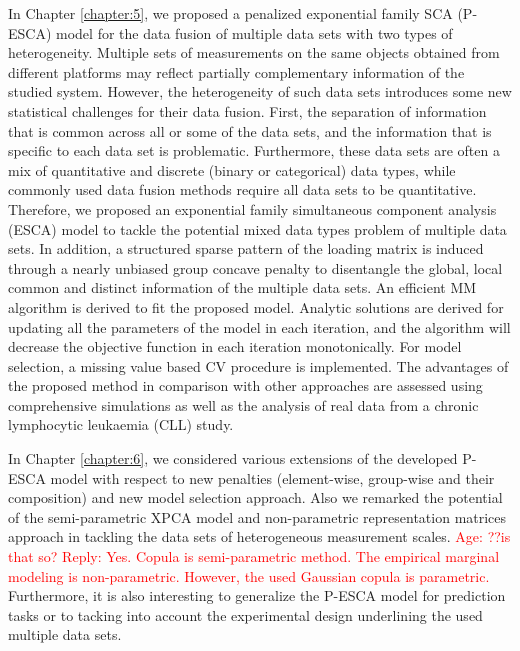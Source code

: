 In Chapter \ref{chapter:5}, we proposed a penalized exponential family SCA (P-ESCA) model for the data fusion of multiple data sets with two types of heterogeneity. Multiple sets of measurements on the same objects obtained from different platforms may reflect partially complementary information of the studied system. However, the heterogeneity of such data sets introduces some new statistical challenges for their data fusion. First, the separation of information that is common across all or some of the data sets, and the information that is specific to each data set is problematic. Furthermore, these data sets are often a mix of quantitative and discrete (binary or categorical) data types, while commonly used data fusion methods require all data sets to be quantitative. Therefore, we proposed an exponential family simultaneous component analysis (ESCA) model to tackle the potential mixed data types problem of multiple data sets. In addition, a structured sparse pattern of the loading matrix is induced through a nearly unbiased group concave penalty to disentangle the global, local common and distinct information of the multiple data sets. An efficient MM algorithm is derived to fit the proposed model. Analytic solutions are derived for updating all the parameters of the model in each iteration, and the algorithm will decrease the objective function in each iteration monotonically. For model selection, a missing value based CV procedure is implemented. The advantages of the proposed method in comparison with other approaches are assessed using comprehensive simulations as well as the analysis of real data from a chronic lymphocytic leukaemia (CLL) study.

In Chapter \ref{chapter:6}, we considered various extensions of the developed P-ESCA model with respect to new penalties (element-wise, group-wise and their composition) and new model selection approach. Also we remarked the potential of the semi-parametric XPCA model and non-parametric representation matrices approach in tackling the data sets of heterogeneous measurement scales. \textcolor{red}{Age: ??is that so? Reply: Yes. Copula is semi-parametric method. The empirical marginal modeling is non-parametric. However, the used Gaussian copula is parametric.} Furthermore, it is also interesting to generalize the P-ESCA model for prediction tasks or to tacking into account the experimental design underlining the used multiple data sets.



